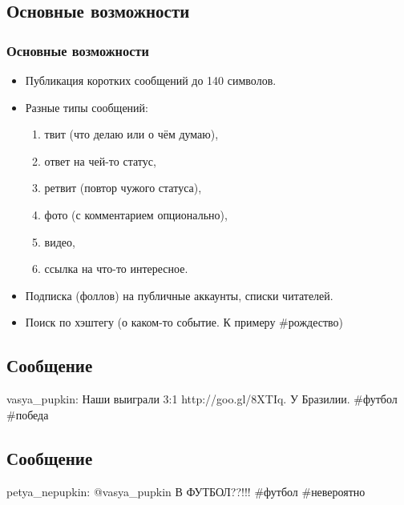 \documentclass[compress,red]{beamer}
\begin{document}
\subsection{Основные возможности}
\begin{frame}
  \frametitle{Основные возможности}
	\begin{itemize}
	\item Публикация коротких сообщений до 140 символов.
	\item Разные типы сообщений: 
		\begin{enumerate}
			\item твит (что делаю или о чём думаю),
			\item ответ на чей-то статус,
			\item ретвит (повтор чужого статуса),
			\item фото (с комментарием опционально),
			\item видео,
			\item ссылка на что-то интересное.
		\end{enumerate}
	\item Подписка (фоллов) на публичные аккаунты, списки читателей.
	\item Поиск по хэштегу (о каком-то событие. К примеру \#рождество)
	\end{itemize}
\end{frame}

\subsection{Сообщение}
\begin{frame}
	\begin{center}
	\large{vasya\_pupkin: Наши выиграли 3:1 http://goo.gl/8XTIq. У Бразилии. \#футбол \#победа}
	\end{center}
\end{frame}

\subsection{Сообщение}
\begin{frame}
	\begin{center}
	\large{petya\_nepupkin: @vasya\_pupkin В ФУТБОЛ??!!! \#футбол \#невероятно}
	\end{center}
\end{frame}
\end{document}
